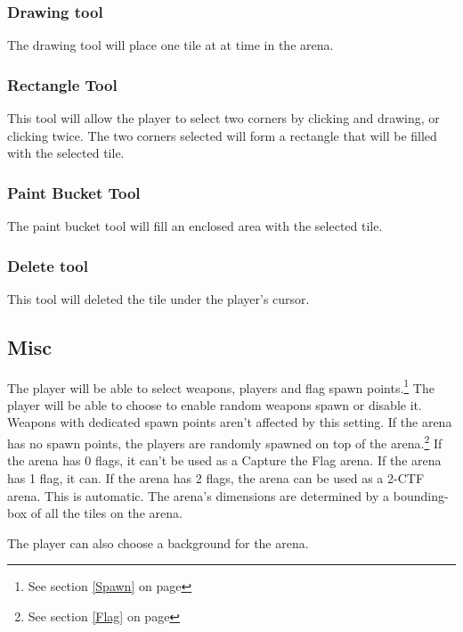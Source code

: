 \documentclass{article}
\begin{document}
\subsubsection{Drawing tool}
The drawing tool will place one tile at at time in the arena.

\subsubsection{Rectangle Tool}
This tool will allow the player to select two corners by clicking and drawing, or clicking twice. The two corners selected will form a rectangle that will be filled with the selected tile.

\subsubsection{Paint Bucket Tool}
The paint bucket tool will fill an enclosed area with the selected tile.

\subsubsection{Delete tool}
This tool will deleted the tile under the player's cursor.

\subsection{Misc}
The player will be able to select weapons, players and flag spawn points.\footnote{See section \ref{Spawn} on page \pageref{Spawn}} The player will be able to choose to enable random weapons spawn or disable it. Weapons with dedicated spawn points aren't affected by this setting. If the arena has no spawn points, the players are randomly spawned on top of the arena.\footnote{See section \ref{Flag} on page \pageref{Flag}} If the arena has 0 flags, it can't be used as a Capture the Flag arena. If the arena has 1 flag, it can. If the arena has 2 flags, the arena can be used as a 2-CTF arena. This is automatic. The arena's dimensions are determined by a bounding-box of all the tiles on the arena.

The player can also choose a background for the arena.
\end{document}
